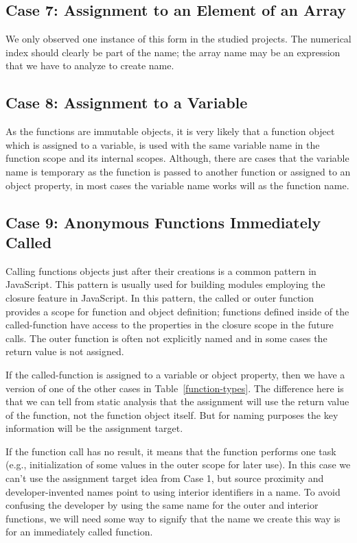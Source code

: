 \documentclass[10pt, preprint]{sigplanconf}
\begin{document}
{\subsection{Case 7: Assignment to an Element of an Array}
We only observed one instance of this form in the studied projects. The numerical index should clearly be part of the name; the array name may be an expression that we have to analyze to create name.

\subsection{Case 8: Assignment to a Variable }
As the functions are immutable objects, it is very likely that a function object which is assigned to a variable, is used with the same variable name in the function scope
and its internal scopes. Although, there are cases that the variable name is temporary as the function is passed to another function or assigned to an object property, in most cases the variable name works will as the function name. 

\subsection{Case 9: Anonymous Functions Immediately Called}
Calling functions objects just after their creations is a common pattern in JavaScript. This pattern is usually used for building modules employing the closure feature in JavaScript.
In this pattern, the called or outer function provides a scope for function and object definition; functions defined inside of the called-function  have access to the properties in the closure scope in the future calls. The outer function is often not explicitly named and in some cases the return value is not assigned. 

If the called-function is assigned to a variable or object property, then we have a version of one of the other cases in Table~\ref{function-types}. The difference here is that we can tell from static analysis that the assignment will use the return value of the function, not the function object itself. But for naming purposes the key information will be the assignment target.

If the function call has no result, it means that the function performs one task (e.g., initialization of some values in the outer scope for later use). In this case we can't use the assignment target idea from Case 1, but source proximity and developer-invented names point to using interior identifiers in a name. To avoid confusing the developer by using the same name for the outer and interior functions, we will need some way to signify that the name we create this way is for an immediately called function.

}
\end{document}
